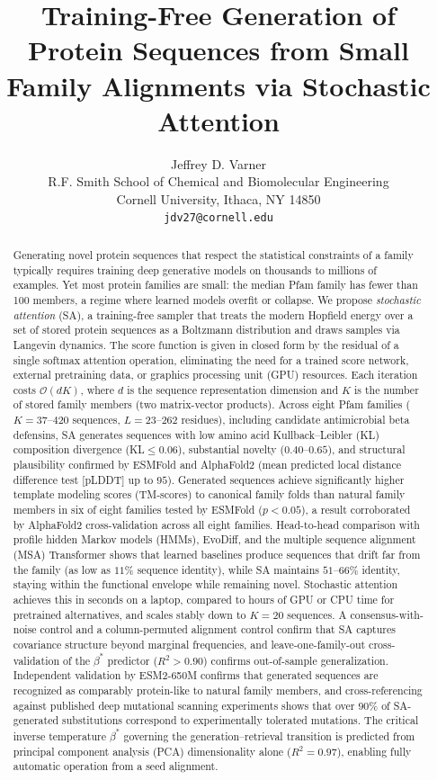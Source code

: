 \documentclass{article}
\title{Training-Free Generation of Protein Sequences from Small Family Alignments via Stochastic Attention}
\author{%
  Jeffrey D. Varner \\
  R.F. Smith School of Chemical and Biomolecular Engineering\\
  Cornell University, Ithaca, NY 14850 \\
  \texttt{jdv27@cornell.edu} \\
}
\theoremstyle{definition}
\theoremstyle{remark}
\begin{document}
\maketitle

\begin{abstract}
Generating novel protein sequences that respect the statistical constraints of a family typically requires training deep generative models on thousands to millions of examples. Yet most protein families are small: the median Pfam family has fewer than 100 members, a regime where learned models overfit or collapse. We propose \emph{stochastic attention} (SA), a training-free sampler that treats the modern Hopfield energy over a set of stored protein sequences as a Boltzmann distribution and draws samples via Langevin dynamics. The score function is given in closed form by the residual of a single softmax attention operation, eliminating the need for a trained score network, external pretraining data, or graphics processing unit (GPU) resources. Each iteration costs $\mathcal{O}(dK)$, where $d$ is the sequence representation dimension and $K$ is the number of stored family members (two matrix-vector products). Across eight Pfam families ($K{=}37$--$420$ sequences, $L{=}23$--$262$ residues), including candidate antimicrobial beta defensins, SA generates sequences with low amino acid Kullback--Leibler (KL) composition divergence (KL${}{\leq}0.06$), substantial novelty ($0.40$--$0.65$), and structural plausibility confirmed by ESMFold and AlphaFold2 (mean predicted local distance difference test [pLDDT] up to $95$). Generated sequences achieve significantly higher template modeling scores (TM-scores) to canonical family folds than natural family members in six of eight families tested by ESMFold ($p < 0.05$), a result corroborated by AlphaFold2 cross-validation across all eight families. Head-to-head comparison with profile hidden Markov models (HMMs), EvoDiff, and the multiple sequence alignment (MSA) Transformer shows that learned baselines produce sequences that drift far from the family (as low as $11\%$ sequence identity), while SA maintains $51$--$66\%$ identity, staying within the functional envelope while remaining novel. Stochastic attention achieves this in seconds on a laptop, compared to hours of GPU or CPU time for pretrained alternatives, and scales stably down to $K{=}20$ sequences. A consensus-with-noise control and a column-permuted alignment control confirm that SA captures covariance structure beyond marginal frequencies, and leave-one-family-out cross-validation of the $\beta^*$ predictor ($R^2 > 0.90$) confirms out-of-sample generalization. Independent validation by ESM2-650M confirms that generated sequences are recognized as comparably protein-like to natural family members, and cross-referencing against published deep mutational scanning experiments shows that over $90\%$ of SA-generated substitutions correspond to experimentally tolerated mutations. The critical inverse temperature $\beta^*$ governing the generation--retrieval transition is predicted from principal component analysis (PCA) dimensionality alone ($R^2{=}0.97$), enabling fully automatic operation from a seed alignment.
\end{abstract}
\end{document}
